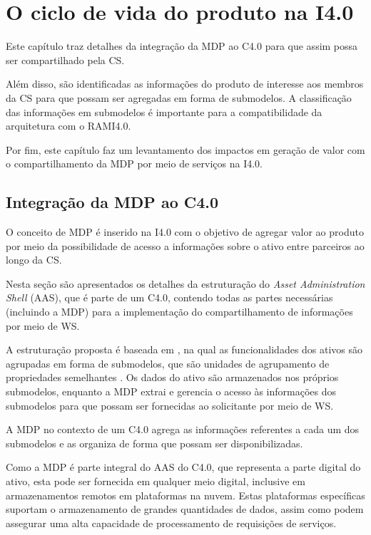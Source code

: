 \chapter{O ciclo de vida do produto na I4.0}
\label{cha:ciclo-de-vida}

Este capítulo traz detalhes da integração da MDP ao C4.0 para que assim possa ser compartilhado pela CS.

Além disso, são identificadas as informações do produto de interesse aos membros da CS para que possam ser agregadas em forma de submodelos. A classificação das informações em submodelos é importante para a compatibilidade da arquitetura com o RAMI4.0.

Por fim, este capítulo faz um levantamento dos impactos em geração de valor com o compartilhamento da MDP por meio de serviços na I4.0.

\section{Integração da MDP ao C4.0}
\label{sec:estrutura-aas}

O conceito de MDP é inserido na I4.0 com o objetivo de agregar valor ao produto por meio da possibilidade de acesso a informações sobre o ativo entre parceiros ao longo da CS.

Nesta seção são apresentados os detalhes da estruturação do \textit{Asset Administration Shell} (AAS), que é parte de um C4.0, contendo todas as partes necessárias (incluindo a MDP) para a implementação do compartilhamento de informações por meio de WS.

A estruturação proposta é baseada em , na qual as funcionalidades dos ativos são agrupadas em forma de submodelos, que são unidades de agrupamento de propriedades semelhantes \cite{bader2019aas, adolph2018roadmap, bedenbender2017aasexamples}. Os dados do ativo são armazenados nos próprios submodelos, enquanto a MDP extrai e gerencia o acesso às informações dos submodelos para que possam ser fornecidas ao solicitante por meio de WS.

A MDP no contexto de um C4.0 agrega as informações referentes a cada um dos submodelos e as organiza de forma que possam ser disponibilizadas.

Como a MDP é parte integral do AAS do C4.0, que representa a parte digital do ativo, esta pode ser fornecida em qualquer meio digital, inclusive em armazenamentos remotos em plataformas na nuvem. Estas plataformas específicas suportam o armazenamento de grandes quantidades de dados, assim como podem assegurar uma alta capacidade de processamento de requisições de serviços.

